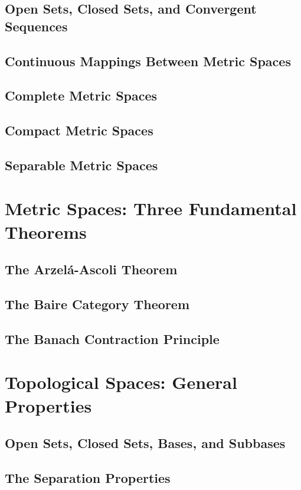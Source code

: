 \documentclass[a4paper,10pt]{book}
\theoremstyle{plain} %
\begin{document}
\section{Open Sets, Closed Sets, and Convergent Sequences}
\section{Continuous Mappings Between Metric Spaces}
\section{Complete Metric Spaces}
\section{Compact Metric Spaces}
\section{Separable Metric Spaces}

\chapter{Metric Spaces: Three Fundamental Theorems}

\section{The Arzel\'a-Ascoli Theorem}
\section{The Baire Category Theorem}
\section{The Banach Contraction Principle}

\chapter{Topological Spaces: General Properties}

\section{Open Sets, Closed Sets, Bases, and Subbases}
\section{The Separation Properties}
\end{document}
